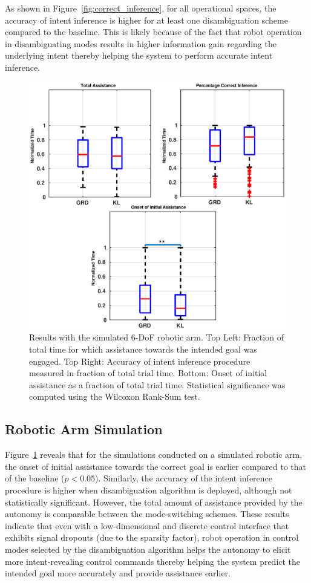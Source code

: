 \documentclass[conference]{IEEEtran}
\begin{document}
As shown in Figure~\ref{fig:correct_inference}, for all operational spaces, the accuracy of intent inference is higher for at least one disambiguation scheme compared to the baseline. This is likely because of the fact that robot operation in disambiguating modes results in higher information gain regarding the underlying intent thereby helping the system to perform accurate intent inference.
\begin{figure}[t]
	\centering
	\includegraphics[width= 1.\hsize, height=0.5\vsize]{./figures/mico_sim.eps}
	\vspace{-0.5cm}
	\caption{Results with the simulated 6-DoF robotic arm. Top Left: Fraction of total time for which assistance towards the intended goal was engaged. Top Right: Accuracy of intent inference procedure measured in fraction of total trial time. Bottom: Onset of initial assistance as a fraction of total trial time. Statistical significance was computed using the Wilcoxon Rank-Sum test. } 
	\label{fig:mico_results}
\end{figure}
\subsection{Robotic Arm Simulation}
Figure~\ref{fig:mico_results} reveals that for the simulations conducted on a simulated robotic arm, the onset of initial assistance towards the correct goal is earlier compared to that of the baseline ($p < 0.05$). Similarly, the accuracy of the intent inference procedure is higher when disambiguation algorithm is deployed, although not statistically significant. However, the total amount of assistance provided by the autonomy is comparable between the mode-switching schemes. These results indicate that even with a low-dimensional and discrete control interface that exhibits signal dropouts (due to the sparsity factor), robot operation in control modes selected by the disambiguation algorithm helps the autonomy to elicit more intent-revealing control commands thereby helping the system predict the intended goal more accurately and provide assistance earlier. 
\end{document}
